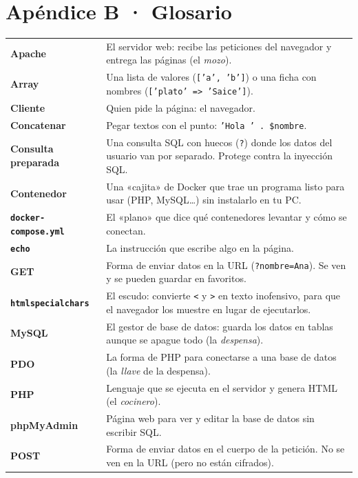 \clearpage
\renewcommand{\seccionactual}{APÉNDICE B · GLOSARIO}
\section*{Apéndice B · Glosario}

\renewcommand{\arraystretch}{1.35}
\begin{longtable}{>{\leavevmode\sffamily\bfseries\color{fuegooscuro}}p{3.6cm} p{12.2cm}}
Apache & El servidor web: recibe las peticiones del navegador y entrega las páginas (el \emph{mozo}). \\
Array & Una lista de valores (\texttt{['a', 'b']}) o una ficha con nombres (\texttt{['plato' => 'Saice']}). \\
Cliente & Quien pide la página: el navegador. \\
Concatenar & Pegar textos con el punto: \texttt{'Hola ' . \$nombre}. \\
Consulta preparada & Una consulta SQL con huecos (\texttt{?}) donde los datos del usuario van por separado. Protege contra la inyección SQL. \\
Contenedor & Una «cajita» de Docker que trae un programa listo para usar (PHP, MySQL\ldots) sin instalarlo en tu PC. \\
\texttt{docker-compose.yml} & El «plano» que dice qué contenedores levantar y cómo se conectan. \\
\texttt{echo} & La instrucción que escribe algo en la página. \\
GET & Forma de enviar datos en la URL (\texttt{?nombre=Ana}). Se ven y se pueden guardar en favoritos. \\
\texttt{htmlspecialchars} & El escudo: convierte \texttt{<} y \texttt{>} en texto inofensivo, para que el navegador los muestre en lugar de ejecutarlos. \\
MySQL & El gestor de base de datos: guarda los datos en tablas aunque se apague todo (la \emph{despensa}). \\
PDO & La forma de PHP para conectarse a una base de datos (la \emph{llave} de la despensa). \\
PHP & Lenguaje que se ejecuta en el servidor y genera HTML (el \emph{cocinero}). \\
phpMyAdmin & Página web para ver y editar la base de datos sin escribir SQL. \\
POST & Forma de enviar datos en el cuerpo de la petición. No se ven en la URL (pero no están cifrados). \\

\end{longtable}
